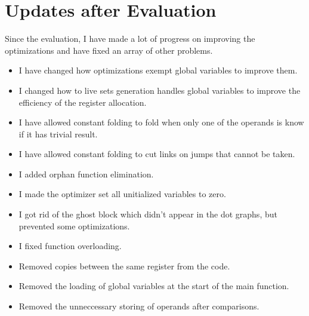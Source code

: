 \newpage
\section*{Updates after Evaluation}
Since the evaluation, I have made a lot of progress on improving the optimizations and have fixed an array of other problems. 
\begin{itemize}
\item I have changed how optimizations exempt global variables to improve them. 
\item I changed how to live sets generation handles global variables to improve the efficiency of the register allocation. 
\item I have allowed constant folding to fold when only one of the operands is know if it has trivial result. 
\item I have allowed constant folding to cut links on jumps that cannot be taken. 
\item I added orphan function elimination. 
\item I made the optimizer set all unitialized variables to zero. 
\item I got rid of the ghost block which didn't appear in the dot graphs, but prevented some optimizations. 
\item I fixed function overloading. 
\item Removed copies between the same register from the code. 
\item Removed the loading of global variables at the start of the main function. 
\item Removed the unneccessary storing of operands after comparisons. 
\end{itemize}